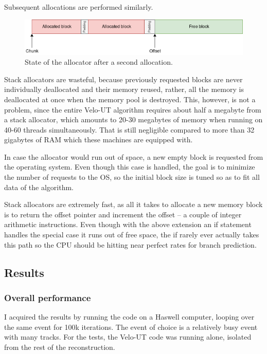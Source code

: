 \documentclass[12pt]{article}
\begin{document}
Subsequent allocations are performed similarly.

\begin{figure}[H]
	\begin{center}
		\includegraphics[width=\textwidth]{velout_stack_allocator_alloc2}
	\end{center}
	\caption{State of the allocator after a second allocation.}
	\label{fig_velout_stack_allocator_alloc2}
\end{figure}

Stack allocators are wasteful, because previously requested blocks are never individually deallocated and their memory reused, rather, all the memory is deallocated at once when the memory pool is destroyed. This, however, is not a problem, since the entire Velo-UT algorithm requires about half a megabyte from a stack allocator, which amounts to 20-30 megabytes of memory when running on 40-60 threads simultaneously. That is still negligible compared to more than 32 gigabytes of RAM which these machines are equipped with.

In case the allocator would run out of space, a new empty block is requested from the operating system. Even though this case is handled, the goal is to minimize the number of requests to the OS, so the initial block size is tuned so as to fit all data of the algorithm.

Stack allocators are extremely fast, as all it takes to allocate a new memory block is to return the offset pointer and increment the offset -- a couple of integer arithmetic instructions. Even though with the above extension an if statement handles the special case it runs out of free space, the if rarely ever actually takes this path so the CPU should be hitting near perfect rates for branch prediction.


\subsection{Results}

\subsubsection{Overall performance}

I acquired the results by running the code on a Haswell computer, looping over the same event for 100k iterations. The event of choice is a relatively busy event with many tracks. For the tests, the Velo-UT code was running alone, isolated from the rest of the reconstruction.
\end{document}
